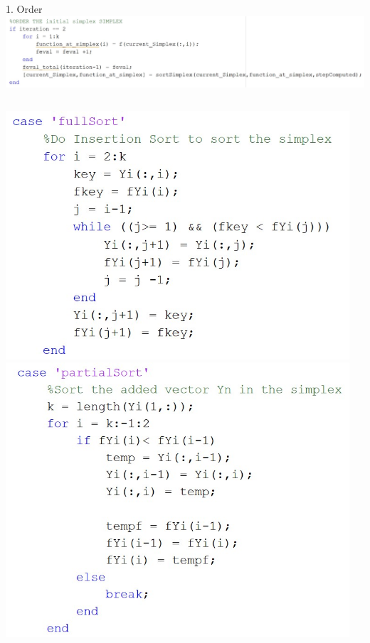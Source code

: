 \documentclass{beamer}
\begin{document}
\begin{frame}{1. Order}
\includegraphics[width=0.75\linewidth]{Order1}
	\begin{columns}
	\begin{column}{0.35\linewidth}
		\centering
		\includegraphics[width=0.95\linewidth]{Shrink2}
		\includegraphics[width=0.95\linewidth]{Order3}
	\end{column}
	\begin{column}{0.59\linewidth}
		\centering

\end{column}
\end{columns}
\end{frame}
\end{document}
